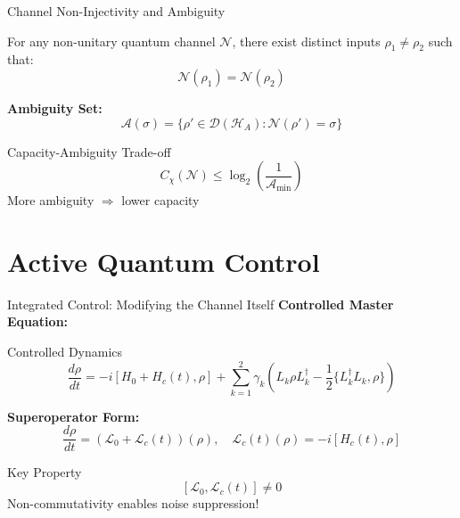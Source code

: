 \documentclass[aspectratio=169,12pt]{beamer}
\newcommand{\Lgen}{\mathcal{L}}
\begin{document}
\begin{frame}{Channel Non-Injectivity and Ambiguity}
\begin{theorem}
For any non-unitary quantum channel $\mathcal{N}$, there exist distinct inputs $\rho_1 \neq \rho_2$ such that:
$$\mathcal{N}(\rho_1) = \mathcal{N}(\rho_2)$$
\end{theorem}

\vspace{0.3cm}

\textbf{Ambiguity Set:}
$$\mathcal{A}(\sigma) = \{ \rho' \in \mathcal{D}(\mathcal{H}_A) : \mathcal{N}(\rho') = \sigma \}$$

\vspace{0.3cm}

\begin{block}{Capacity-Ambiguity Trade-off}
$$C_\chi(\mathcal{N}) \leq \log_2 \left( \frac{1}{\mathcal{A}_{\min}} \right)$$
More ambiguity $\Rightarrow$ lower capacity
\end{block}
\end{frame}

\section{Active Quantum Control}

\begin{frame}{Integrated Control: Modifying the Channel Itself}
\textbf{Controlled Master Equation:}
\begin{alertblock}{Controlled Dynamics}
$$\frac{d\rho}{dt} = -i[H_0 + H_c(t), \rho] + \sum_{k=1}^2 \gamma_k \left( L_k \rho L_k^\dagger - \frac{1}{2} \{ L_k^\dagger L_k, \rho \} \right)$$
\end{alertblock}

\vspace{0.3cm}

\textbf{Superoperator Form:}
$$\frac{d\rho}{dt} = (\Lgen_0 + \Lgen_c(t))(\rho), \quad \Lgen_c(t)(\rho) = -i[H_c(t), \rho]$$

\vspace{0.3cm}

\begin{block}{Key Property}
$$[\Lgen_0, \Lgen_c(t)] \neq 0$$
Non-commutativity enables noise suppression!
\end{block}
\end{frame}
\end{document}
